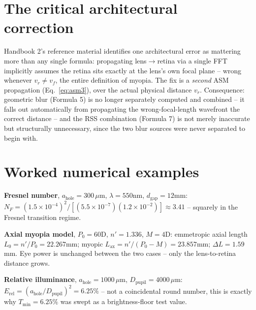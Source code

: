 \documentclass[11pt]{report}
\newcommand{\ahole}{a_{\text{hole}}}
\newcommand{\dgap}{d_{\text{gap}}}
\newcommand{\vr}{v_r}
\newcommand{\vf}{v_f}
\newcommand{\Dpupil}{D_{\text{pupil}}}
\newcommand{\Erel}{E_{\text{rel}}}
\begin{document}
\section{The critical architectural correction}
\label{sec:asmfix}
Handbook 2's reference material identifies one architectural error as mattering more than any
single formula: propagating lens$\to$retina via a single FFT implicitly assumes the retina
sits exactly at the lens's own focal plane -- wrong whenever $\vr\neq\vf$, the entire
definition of myopia. The fix is a \emph{second} ASM propagation (Eq.~\ref{eq:asm3}), over the
actual physical distance $\vr$. Consequence: geometric blur (Formula 5) is no longer
separately computed and combined -- it falls out automatically from propagating the
wrong-focal-length wavefront the correct distance -- and the RSS combination (Formula 7) is
not merely inaccurate but structurally unnecessary, since the two blur sources were never
separated to begin with.

\section{Worked numerical examples}
\textbf{Fresnel number}, $\ahole{=}300\,\mu$m, $\lambda{=}550$nm, $\dgap{=}12$mm:
$N_F=(1.5\times10^{-4})^2/[(5.5\times10^{-7})(1.2\times10^{-2})]\approx3.41$ -- squarely in
the Fresnel transition regime.

\textbf{Axial myopia model}, $P_0{=}60$D, $n'{=}1.336$, $M{=}4$D: emmetropic axial length
$L_0=n'/P_0=22.267$mm; myopic $L_{\text{ax}}=n'/(P_0-M)=23.857$mm; $\Delta L=1.59$mm. Eye
power is unchanged between the two cases -- only the lens-to-retina distance grows.

\textbf{Relative illuminance}, $\ahole{=}1000\,\mu$m, $\Dpupil{=}4000\,\mu$m:
$\Erel=(\ahole/\Dpupil)^2=6.25\%$ -- not a coincidental round number, this is exactly why
$T_{\min}{=}6.25\%$ was swept as a brightness-floor test value.
\end{document}
